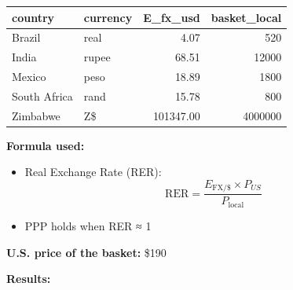 \documentclass[
]{article}
\providecommand{\tightlist}{%
  \setlength{\itemsep}{0pt}\setlength{\parskip}{0pt}}
\begin{document}
\begin{longtable}[]{@{}llrr@{}}
\toprule\noalign{}
country & currency & E\_fx\_usd & basket\_local \\
\midrule\noalign{}
\endhead
\bottomrule\noalign{}
\endlastfoot
Brazil & real & 4.07 & 520 \\
India & rupee & 68.51 & 12000 \\
Mexico & peso & 18.89 & 1800 \\
South Africa & rand & 15.78 & 800 \\
Zimbabwe & Z\$ & 101347.00 & 4000000 \\
\end{longtable}

\textbf{Formula used:}

\begin{itemize}
\tightlist
\item
  Real Exchange Rate (RER):\\
  \[
  \text{RER} = \frac{E_{\text{FX}/\$} \times P_{US}}{P_{\text{local}}}
  \]
\item
  PPP holds when RER ≈ 1
\end{itemize}

\textbf{U.S. price of the basket:} \$190

\textbf{Results:}
\end{document}
